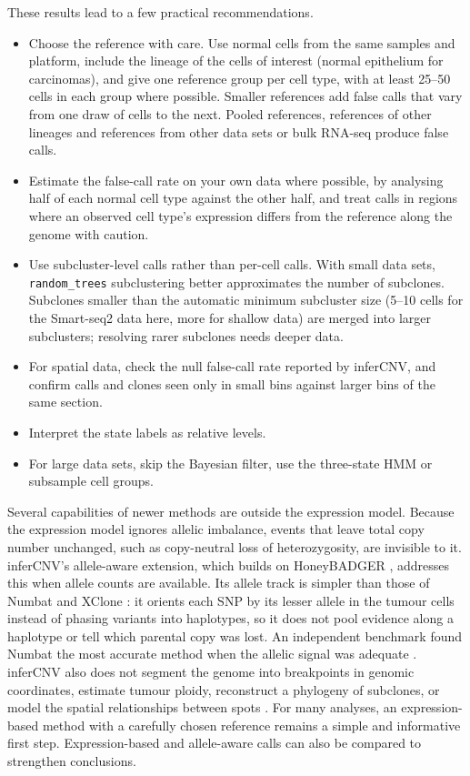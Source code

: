 These results lead to a few practical recommendations.
\begin{itemize}
\tightlist
\item Choose the reference with care. Use normal cells from the same samples and platform, include the lineage of the cells of interest (normal epithelium for carcinomas), and give one reference group per cell type, with at least 25--50 cells in each group where possible. Smaller references add false calls that vary from one draw of cells to the next. Pooled references, references of other lineages and references from other data sets or bulk RNA-seq produce false calls.
\item Estimate the false-call rate on your own data where possible, by analysing half of each normal cell type against the other half, and treat calls in regions where an observed cell type's expression differs from the reference along the genome with caution.
\item Use subcluster-level calls rather than per-cell calls. With small data sets, \texttt{random\_trees} subclustering better approximates the number of subclones. Subclones smaller than the automatic minimum subcluster size (5--10 cells for the Smart-seq2 data here, more for shallow data) are merged into larger subclusters; resolving rarer subclones needs deeper data.
\item For spatial data, check the null false-call rate reported by inferCNV, and confirm calls and clones seen only in small bins against larger bins of the same section.
\item Interpret the state labels as relative levels.
\item For large data sets, skip the Bayesian filter, use the three-state HMM or subsample cell groups.
\end{itemize}

Several capabilities of newer methods are outside the expression model. Because the expression model ignores allelic imbalance, events that leave total copy number unchanged, such as copy-neutral loss of heterozygosity, are invisible to it. inferCNV's allele-aware extension, which builds on HoneyBADGER \citep{fan2018}, addresses this when allele counts are available. Its allele track is simpler than those of Numbat and XClone \citep{gao2023numbat, huang2024xclone}: it orients each SNP by its lesser allele in the tumour cells instead of phasing variants into haplotypes, so it does not pool evidence along a haplotype or tell which parental copy was lost. An independent benchmark found Numbat the most accurate method when the allelic signal was adequate \citep{chang2026preprint}. inferCNV also does not segment the genome into breakpoints in genomic coordinates, estimate tumour ploidy, reconstruct a phylogeny of subclones, or model the spatial relationships between spots \citep{gao2023numbat, defalco2023, ma2024calicost}. For many analyses, an expression-based method with a carefully chosen reference remains a simple and informative first step. Expression-based and allele-aware calls can also be compared to strengthen conclusions.
